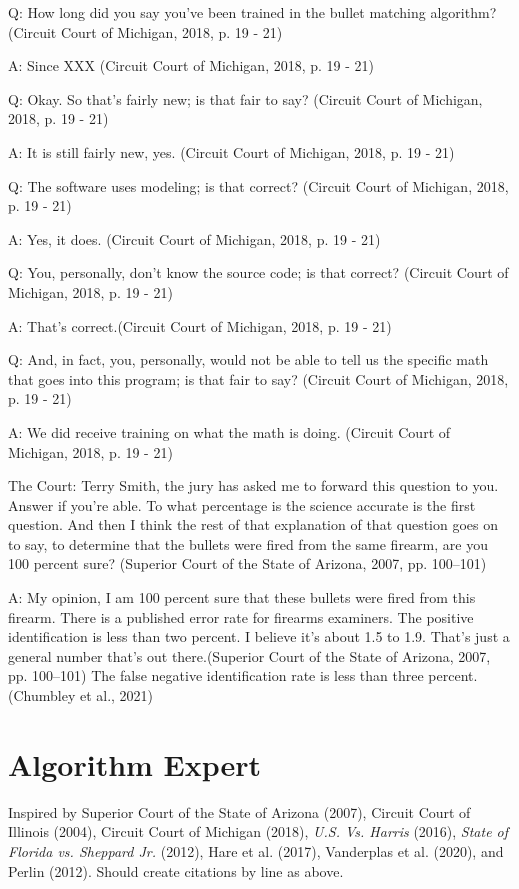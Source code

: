 \documentclass[print]{nuthesis}
\begin{document}
Q: How long did you say you've been trained in the bullet matching algorithm? (Circuit Court of Michigan, 2018, p. 19 - 21)

A: Since XXX (Circuit Court of Michigan, 2018, p. 19 - 21)

Q: Okay. So that's fairly new; is that fair to say? (Circuit Court of Michigan, 2018, p. 19 - 21)

A: It is still fairly new, yes. (Circuit Court of Michigan, 2018, p. 19 - 21)

Q: The software uses modeling; is that correct? (Circuit Court of Michigan, 2018, p. 19 - 21)

A: Yes, it does. (Circuit Court of Michigan, 2018, p. 19 - 21)

Q: You, personally, don't know the source code; is that correct? (Circuit Court of Michigan, 2018, p. 19 - 21)

A: That's correct.(Circuit Court of Michigan, 2018, p. 19 - 21)

Q: And, in fact, you, personally, would not be able to tell us the specific math that goes into this program; is that fair to say? (Circuit Court of Michigan, 2018, p. 19 - 21)

A: We did receive training on what the math is doing. (Circuit Court of Michigan, 2018, p. 19 - 21)

The Court: Terry Smith, the jury has asked me to forward this question to you. Answer if you're able.
To what percentage is the science accurate is the first question. And then I think the rest of that explanation of that question goes on to say, to determine that the bullets were fired from the same firearm, are you 100 percent sure? (Superior Court of the State of Arizona, 2007, pp. 100--101)

A: My opinion, I am 100 percent sure that these bullets were fired from this firearm.
There is a published error rate for firearms examiners.
The positive identification is less than two percent.
I believe it's about 1.5 to 1.9. That's just a general number that's out there.(Superior Court of the State of Arizona, 2007, pp. 100--101)
The false negative identification rate is less than three percent. (Chumbley et al., 2021)

\hypertarget{algorithm-expert}{%
\section{Algorithm Expert}\label{algorithm-expert}}

Inspired by Superior Court of the State of Arizona (2007), Circuit Court of Illinois (2004), Circuit Court of Michigan (2018), \emph{{U.S.} Vs. {Harris}} (2016), \emph{State of {Florida} vs. Sheppard {Jr.}} (2012), Hare et al. (2017), Vanderplas et al. (2020), and Perlin (2012). Should create citations by line as above.
\end{document}
